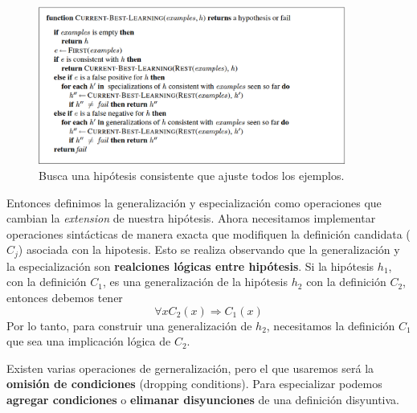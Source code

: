 \documentclass[12 pt, a4paper]{article}
\begin{document}
				\begin{figure}[h]
					\centering
					\includegraphics[width=0.9\textwidth]{BMHA_algorithm.png}
					\caption{Busca una hipótesis consistente que ajuste todos los ejemplos.}%
				\end{figure}
			Entonces definimos la generalización y especialización como operaciones que cambian la \emph{extension} de nuestra hipótesis. Ahora necesitamos implementar operaciones sintácticas de manera exacta que modifiquen la definición candidata (\(C_{j}\)) asociada con la hipotesis. Esto se realiza observando que la generalización y la especialización son \textbf{realciones lógicas entre hipótesis}. Si la hipótesis $h_{1}$, con la definición $C_{1}$, es una generalización de la hipótesis $h_{2}$ con la definición $C_{2}$, entonces debemos tener
				$$\forall x C_{2}(x) \Rightarrow C_{1}(x)$$
			Por lo tanto, para construir una generalización de $h_{2}$, necesitamos la definición $C_{1}$ que sea una implicación lógica de $C_{2}$. 
			
			Existen varias operaciones de gerneralización, pero el que usaremos será la \textbf{omisión de condiciones} (dropping conditions). Para especializar podemos \textbf{agregar condiciones} o \textbf{elimanar disyunciones} de una definición disyuntiva.
			
\end{document}
